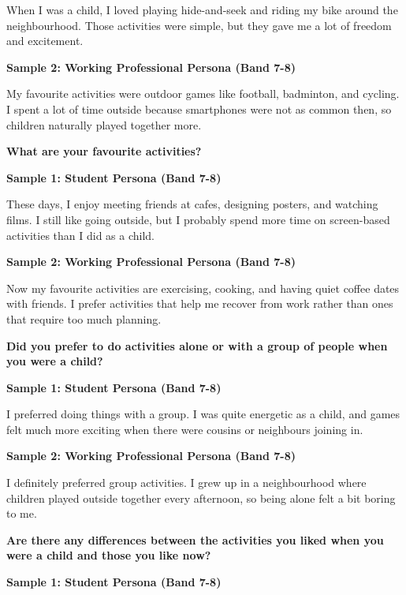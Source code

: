 When I was a child, I loved playing hide-and-seek and riding my bike around the neighbourhood. Those activities were simple, but they gave me a lot of freedom and excitement.

\textbf{Sample 2: Working Professional Persona (Band 7-8)}

My favourite activities were outdoor games like football, badminton, and cycling. I spent a lot of time outside because smartphones were not as common then, so children naturally played together more.

\separator

\begin{ieltsquestion}
\textbf{What are your favourite activities?}
\end{ieltsquestion}
\textbf{Sample 1: Student Persona (Band 7-8)}

These days, I enjoy meeting friends at cafes, designing posters, and watching films. I still like going outside, but I probably spend more time on screen-based activities than I did as a child.

\textbf{Sample 2: Working Professional Persona (Band 7-8)}

Now my favourite activities are exercising, cooking, and having quiet coffee dates with friends. I prefer activities that help me recover from work rather than ones that require too much planning.

\separator

\begin{ieltsquestion}
\textbf{Did you prefer to do activities alone or with a group of people when you were a child?}
\end{ieltsquestion}
\textbf{Sample 1: Student Persona (Band 7-8)}

I preferred doing things with a group. I was quite energetic as a child, and games felt much more exciting when there were cousins or neighbours joining in.

\textbf{Sample 2: Working Professional Persona (Band 7-8)}

I definitely preferred group activities. I grew up in a neighbourhood where children played outside together every afternoon, so being alone felt a bit boring to me.

\separator

\begin{ieltsquestion}
\textbf{Are there any differences between the activities you liked when you were a child and those you like now?}
\end{ieltsquestion}
\textbf{Sample 1: Student Persona (Band 7-8)}

